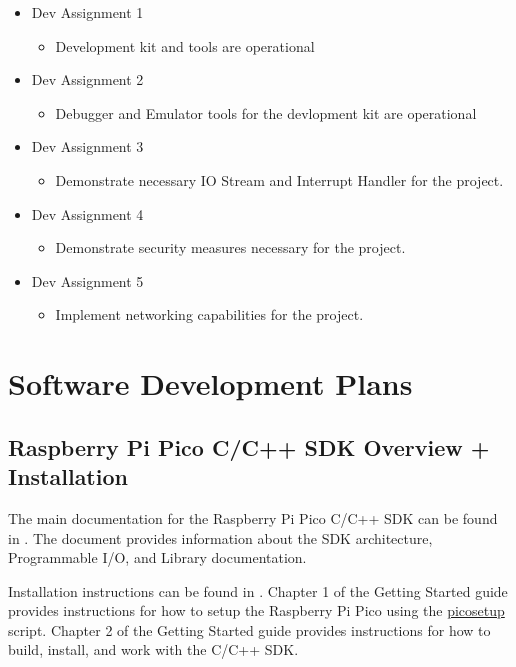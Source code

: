 {\begin{itemize}
    \item Dev Assignment 1
    \begin{itemize}
        \item Development kit and tools are operational
    \end{itemize}
    \item Dev Assignment 2
    \begin{itemize}
        \item Debugger and Emulator tools for the devlopment kit are operational
    \end{itemize}
    \item Dev Assignment 3
    \begin{itemize}
        \item Demonstrate necessary IO Stream and Interrupt Handler for the project.
    \end{itemize}
    \item Dev Assignment 4
    \begin{itemize}
        \item Demonstrate security measures necessary for the project.
    \end{itemize}
    \item Dev Assignment 5
    \begin{itemize}
        \item Implement networking capabilities for the project.
    \end{itemize}
\end{itemize}

\section{Software Development Plans}
\label{loc:SDP_SoftwareDevelopmentPlans}
% 

\subsection{Raspberry Pi Pico C/C++ SDK Overview + Installation}

The main documentation for the Raspberry Pi Pico C/C++ SDK can be found in \citePicoSDK. 
The document provides information about the SDK architecture, Programmable I/O, and Library documentation. 

Installation instructions can be found in \citePicoGetStart. Chapter 1 of the Getting Started guide provides instructions for how to setup the Raspberry Pi Pico using the \href{https://raw.githubusercontent.com/raspberrypi/pico-setup/master/pico_setup.sh}{pico\textunderscore setup} script.
Chapter 2 of the Getting Started guide provides instructions for how to build, install, and work with the C/C++ SDK. 

}
